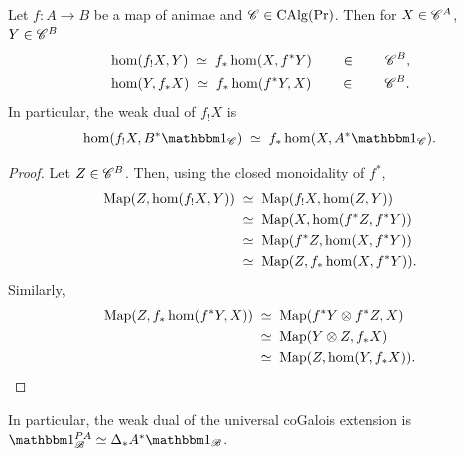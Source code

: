 \documentclass[english,svgnames,table]{article}
\begin{document}
    \begin{corollary}
    \label{cor:internal-adjoints-maps-of-animae}
        Let $f \colon A \to B$ be a map of animae and $\mathscr{C} \in \operatorname{CAlg}(\operatorname{Pr})$. Then for $X \in \mathscr{C}^A$, $Y \in \mathscr{C}^B$
        \begin{equation*}
            \begin{split}
                & \hom(f_! X, Y) \;\simeq\; f_*\hom(X, f^* Y) \qquad \in \qquad \mathscr{C}^B, \\
                & \hom(Y, f_* X) \;\simeq\; f_*\hom(f^* Y, X) \qquad \in \qquad \mathscr{C}^B.
            \end{split}
        \end{equation*}
        In particular, the weak dual of $f_! X$ is
        \begin{equation*}
            \hom(f_! X, B^* \ounit_{\cC}) \;\simeq\; f_* \hom(X, A^* \ounit_{\cC}).
        \end{equation*}
    \end{corollary}
    \begin{proof}
        Let $Z \in \mathscr{C}^B$. Then, using the closed monoidality of $f^*$,
        \begin{equation*}
            \begin{split}
                \operatorname{Map}(Z, \hom(f_! X, Y)) 
                & \;\simeq\; \operatorname{Map}(f_! X, \hom(Z, Y)) \\
                & \;\simeq\; \operatorname{Map}(X, \hom(f^* Z, f^* Y)) \\
                & \;\simeq\; \operatorname{Map}(f^* Z, \hom(X, f^* Y)) \\
                & \;\simeq\; \operatorname{Map}(Z, f_* \hom(X, f^* Y)).
            \end{split}
        \end{equation*}
        Similarly,
        \begin{equation*}
            \begin{split}
                \operatorname{Map}(Z, f_* \hom(f^* Y, X))
                & \;\simeq\; \operatorname{Map}(f^* Y \otimes f^* Z, X) \\
                & \;\simeq\; \operatorname{Map}(Y \otimes Z, f_* X) \\
                & \;\simeq\; \operatorname{Map}(Z, \hom(Y, f_* X)).
            \end{split}
        \end{equation*}
    \end{proof}

    In particular, the weak dual of the universal coGalois extension is $\ounit_{\basecat}^{\Path A} \simeq \Delta_* A^* \ounit_{\basecat}$.
\end{document}
